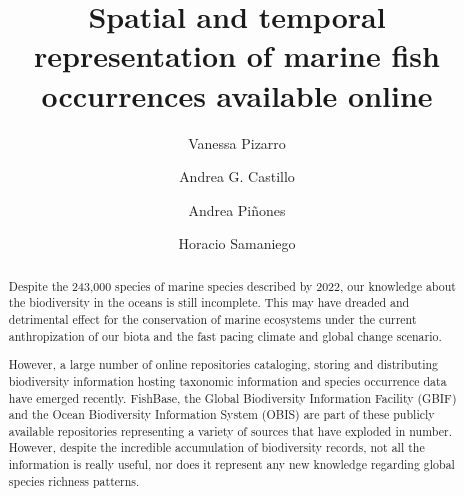 \documentclass[12pt,authoryear]{elsarticle}
\begin{document}
\begin{frontmatter}

  \title{
    Spatial and temporal representation of marine fish occurrences available online
  } 
  \author[ecoinfo]{Vanessa Pizarro}
  \author[ecoinfo,uach]{Andrea G. Castillo}
  \author[icml,FONDAP,COPAS,BASE]{Andrea Pi\~nones}
  \author[ecoinfo,iscv]{Horacio Samaniego}

  \address[ecoinfo]{Laboratorio de Ecoinform\'atica, Instituto de Conservación, Biodiversidad y Territorio, Universidad Austral de Chile, Valdivia, Chile}
  \address [uach] {Programa de Doctorado en Ciencias mención Ecología y Evolución, Escuela de Graduados, Facultad de Ciencias, Universidad Austral de Chile, Valdivia, Chile}
  \address[icml] {Instituto de Ciencias Marinas y Limnológicas, Facultad de Ciencias, Universidad Austral de Chile, Valdivia, Chile}
  \address[FONDAP]{Centro FONDAP de Investigación en Dinámica de Ecosistemas Marinos de Altas Latitudes (IDEAL), Valdivia, Chile}
  \address[COPAS]{Centro de Investigaci\'on Oceanogr\'afica COPAS-COASTAL, Universidad de Concepci\'on, Chile}
  \address[BASE]{Millenium Institute Biodiversity of Antarctic and Subantarctic Ecosystems - BASE, Chile}
  \address[iscv]{Instituto de Sistemas Complejos de Valpara\'iso, Subida Artiller\'ia 470, Valpara\'iso, Chile}



\linenumbers
\singlespacing

\begin{abstract} 

Despite the 243,000 species of  marine species described by 2022, our knowledge about the biodiversity in the oceans is still incomplete. This may have dreaded and detrimental effect for the conservation of marine ecosystems under the current anthropization of our biota and the fast pacing climate and global change scenario.

However, a large number of online repositories cataloging, storing and distributing biodiversity information hosting taxonomic information and species occurrence data have emerged recently. FishBase, the Global Biodiversity Information Facility (GBIF) and the Ocean Biodiversity Information System (OBIS) are part of these publicly available repositories  representing a variety of sources that have exploded in number. However, despite the incredible accumulation of biodiversity records, not all the information is really useful, nor does it represent any new knowledge regarding global species richness patterns.


\end{abstract}
\end{frontmatter}
\end{document}
